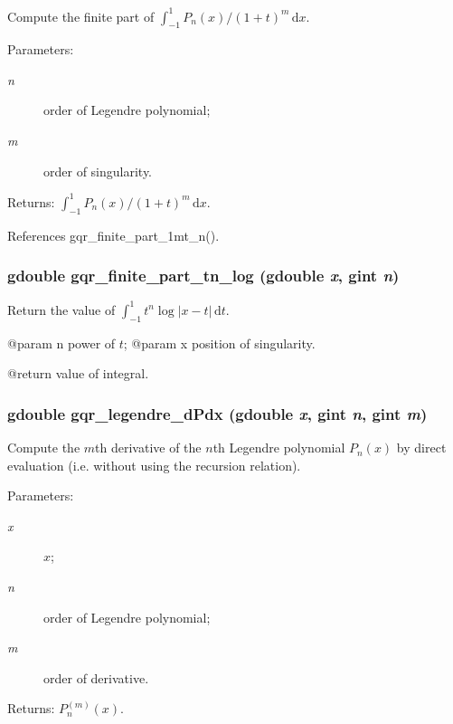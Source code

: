 Compute the finite part of $\int_{-1}^{1}P_{n}(x)/(1+t)^{m}\,\mathrm{d}x$.

\begin{Desc}
\item[Parameters:]
\begin{description}
\item[{\em n}]order of Legendre polynomial; \item[{\em m}]order of singularity.\end{description}
\end{Desc}
\begin{Desc}
\item[Returns:]$\int_{-1}^{1}P_{n}(x)/(1+t)^{m}\,\mathrm{d}x$. \end{Desc}


References gqr\_\-finite\_\-part\_\-1mt\_\-n().
\subsubsection{\setlength{\rightskip}{0pt plus 5cm}gdouble gqr\_\-finite\_\-part\_\-tn\_\-log (gdouble {\em x}, \/  gint {\em n})}\label{fpart_8c_1af1c5ba0a9fb3f797c27f314f73c353}


Return the value of $\int_{-1}^{1}t^{n}\log|x-t|\,\mathrm{d}t$.

@param n power of $t$; @param x position of singularity.

@return value of integral. 
\subsubsection{\setlength{\rightskip}{0pt plus 5cm}gdouble gqr\_\-legendre\_\-dPdx (gdouble {\em x}, \/  gint {\em n}, \/  gint {\em m})}\label{fpart_8c_fdf20c225f6de1835e824b5017d84536}


Compute the $m$th derivative of the $n$th Legendre polynomial $P_{n}(x)$ by direct evaluation (i.e. without using the recursion relation).

\begin{Desc}
\item[Parameters:]
\begin{description}
\item[{\em x}]$x$; \item[{\em n}]order of Legendre polynomial; \item[{\em m}]order of derivative.\end{description}
\end{Desc}
\begin{Desc}
\item[Returns:]$P_{n}^{(m)}(x)$. \end{Desc}
